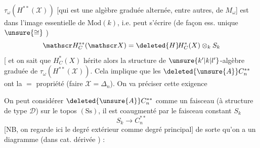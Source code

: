 $\tau_\omega(H^{**}(\mathscr X))$ [qui est une algèbre graduée  alternée, entre autres, de $M_\omega$] est  dans l'image essentielle de $\mathrm{Mod}(k)$, i.e. peut s'écrire (de façon ess. unique  $\unsure{\cong}$ )
\[
 \mathscr H_C^{**}(\mathscr X)=\deleted{H}\!H_C^*(X)\otimes_k S_k
\]
[ et on sait que $H_C^*(X)$ hérite alors la structure de $\unsure{k'|k|l'}$-algèbre graduée de $\tau_\omega(H^{**}(\mathscr X))$. Cela implique que  les $\deleted{\unsure{A}}C_n^{**}$ ont la $=$ propriété (faire $\mathscr X=\Delta_n$).
 On va préciser cette exigence

On peut considérer $\deleted{\unsure{A}}C_n^{**}$ comme un faisceau (à structure de type $\mathscr D$) sur  le topos $(\mathrm{Ss})$, il est coaugmenté par le faisceau constant $S_k$
\[
 S_k\longrightarrow C_{n}^{**}
\]
 [NB, on regarde ici le degré extérieur comme degré principal] de sorte qu'on a un diagramme (dans  cat. dérivée   ) :

